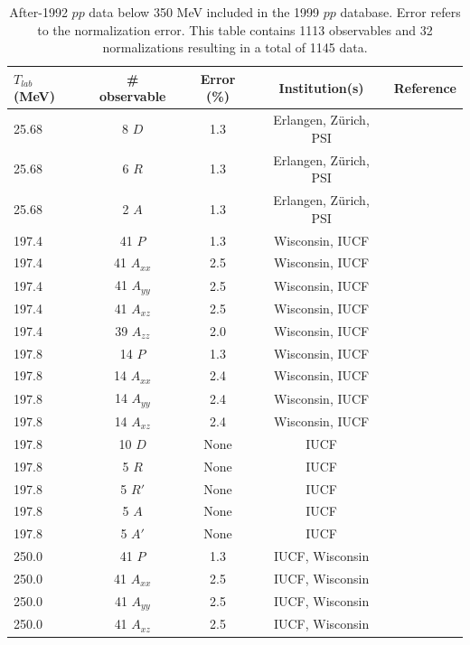 \begin{table}
\caption{After-1992 $pp$ data below 350 MeV included in the 1999 $pp$ database.
Error refers to the normalization error. This table contains 1113 observables
and 32 normalizations resulting in a total of 1145 data.}
\begin{tabular}{lcccr}
                   
   $T_{lab}$ (MeV)
 & \# observable
 & Error (\%)
 & Institution(s)
 & Reference

\\
\hline                                                                          
25.68 & 8 $D$ & 1.3 & Erlangen, Z\"urich, PSI & \cite{Kr94} \\
25.68 & 6 $R$ & 1.3 & Erlangen, Z\"urich, PSI & \cite{Kr94} \\
25.68 & 2 $A$ & 1.3 & Erlangen, Z\"urich, PSI & \cite{Kr94} \\
197.4 & 41 $P$ & 1.3 &  Wisconsin, IUCF & \cite{Rat98} \\
197.4 & 41 $A_{xx}$ & 2.5 &  Wisconsin, IUCF & \cite{Rat98} \\
197.4 & 41 $A_{yy}$ & 2.5 &  Wisconsin, IUCF & \cite{Rat98} \\
197.4 & 41 $A_{xz}$ & 2.5 &  Wisconsin, IUCF & \cite{Rat98} \\
197.4 & 39 $A_{zz}$ & 2.0 &  Wisconsin, IUCF & \cite{Lo00} \\
197.8 & 14 $P$ & 1.3 &  Wisconsin, IUCF & \cite{Ha97} \\
197.8 & 14 $A_{xx}$ & 2.4 &  Wisconsin, IUCF & \cite{Ha97} \\
197.8 & 14 $A_{yy}$ & 2.4 &  Wisconsin, IUCF & \cite{Ha97} \\
197.8 & 14 $A_{xz}$ & 2.4 &  Wisconsin, IUCF & \cite{Ha97} \\
197.8 & 10 $D$ & None &  IUCF & \cite{Wi99} \\
197.8 &  5 $R$ & None &  IUCF & \cite{Wi99} \\
197.8 &  5 $R'$ & None &  IUCF & \cite{Wi99} \\
197.8 &  5 $A$ & None &  IUCF & \cite{Wi99} \\
197.8 &  5 $A'$ & None &  IUCF & \cite{Wi99} \\
250.0 & 41 $P$ & 1.3 &  IUCF, Wisconsin & \cite{Pr98} \\
250.0 & 41 $A_{xx}$ & 2.5 &  IUCF, Wisconsin & \cite{Pr98} \\
250.0 & 41 $A_{yy}$ & 2.5 &  IUCF, Wisconsin & \cite{Pr98} \\
250.0 & 41 $A_{xz}$ & 2.5 &  IUCF, Wisconsin & \cite{Pr98} \\

\end{tabular}
\end{table}
